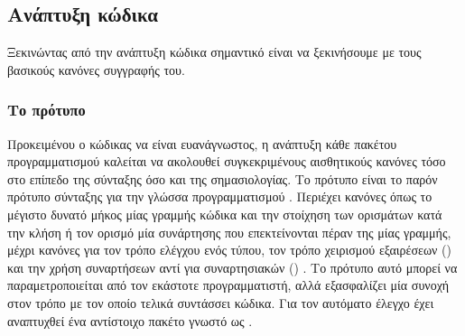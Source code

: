 \subsection{Ανάπτυξη κώδικα}
Ξεκινώντας από την ανάπτυξη κώδικα σημαντικό είναι να ξεκινήσουμε με τους βασικούς κανόνες συγγραφής του.
\subsubsection{Το πρότυπο }
Προκειμένου ο κώδικας να είναι ευανάγνωστος, η ανάπτυξη κάθε πακέτου προγραμματισμού  καλείται να ακολουθεί συγκεκριμένους αισθητικούς κανόνες τόσο στο επίπεδο της σύνταξης όσο και της σημασιολογίας.
Το πρότυπο  είναι το παρόν πρότυπο σύνταξης για την γλώσσα προγραμματισμού .
Περιέχει κανόνες όπως το μέγιστο δυνατό μήκος μίας γραμμής κώδικα και την στοίχηση των ορισμάτων κατά την κλήση ή τον ορισμό μία συνάρτησης που επεκτείνονται πέραν της μίας γραμμής, μέχρι κανόνες για τον τρόπο ελέγχου ενός τύπου, τον τρόπο χειρισμού εξαιρέσεων () και την χρήση συναρτήσεων αντί για συναρτησιακών () \cite{PEP8}.
Το πρότυπο αυτό μπορεί να παραμετροποιείται από τον εκάστοτε προγραμματιστή, αλλά εξασφαλίζει μία συνοχή στον τρόπο με τον οποίο τελικά συντάσσει κώδικα.
Για τον αυτόματο έλεγχο έχει αναπτυχθεί ένα αντίστοιχο πακέτο γνωστό ως \href{https://pypi.org/project/flake8/}{}.
